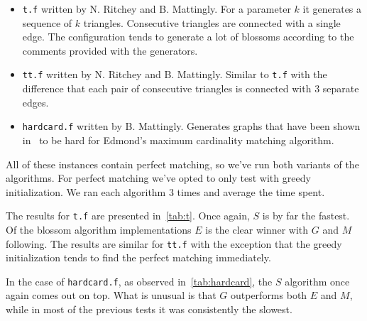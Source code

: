 \begin{itemize}
    \item \texttt{t.f} written by N. Ritchey and B. Mattingly. For a parameter $k$ it generates a sequence of $k$ triangles. Consecutive triangles are connected with a single edge. The configuration tends to generate a lot of blossoms according to the comments provided with the generators.
    \item \texttt{tt.f} written by N. Ritchey and B. Mattingly. Similar to \texttt{t.f} with the difference that each pair of consecutive triangles is connected with $3$ separate edges.
    \item \texttt{hardcard.f} written by B. Mattingly. Generates graphs that have been shown in~\cite{gabow1976efficient} to be hard for Edmond's maximum cardinality matching algorithm.
\end{itemize}

All of these instances contain perfect matching, so we've run both variants of the algorithms. For perfect matching we've opted to only test with greedy initialization. We ran each algorithm $3$ times and average the time spent.

The results for \texttt{t.f} are presented in~\ref{tab:t}. Once again, $S$ is by far the fastest. Of the blossom algorithm implementations $E$ is the clear winner with $G$ and $M$ following. The results are similar for \texttt{tt.f} with the exception that the greedy initialization tends to find the perfect matching immediately. 

In the case of \texttt{hardcard.f}, as observed in~\ref{tab:hardcard}, the $S$ algorithm once again comes out on top. What is unusual is that $G$ outperforms both $E$ and $M$, while in most of the previous tests it was consistently the slowest. 


